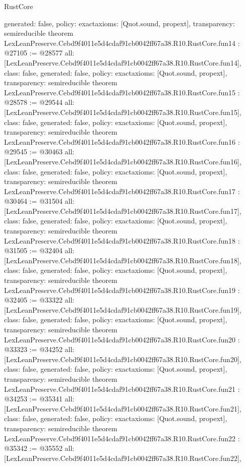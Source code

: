 \begin{lexlean}{RustCore}
\begin{coremodule}
{  generated: false,
  policy: exact{axioms: [Quot.sound, propext]},
  transparency: semireducible
}
theorem LexLeanPreserve.Cebd9f4011e5d4cdaf91cb0042ff67a38.R10.RustCore.fun14 : @27105 := @28577 {
  all: [LexLeanPreserve.Cebd9f4011e5d4cdaf91cb0042ff67a38.R10.RustCore.fun14],
  class: false,
  generated: false,
  policy: exact{axioms: [Quot.sound, propext]},
  transparency: semireducible
}
theorem LexLeanPreserve.Cebd9f4011e5d4cdaf91cb0042ff67a38.R10.RustCore.fun15 : @28578 := @29544 {
  all: [LexLeanPreserve.Cebd9f4011e5d4cdaf91cb0042ff67a38.R10.RustCore.fun15],
  class: false,
  generated: false,
  policy: exact{axioms: [Quot.sound, propext]},
  transparency: semireducible
}
theorem LexLeanPreserve.Cebd9f4011e5d4cdaf91cb0042ff67a38.R10.RustCore.fun16 : @29545 := @30463 {
  all: [LexLeanPreserve.Cebd9f4011e5d4cdaf91cb0042ff67a38.R10.RustCore.fun16],
  class: false,
  generated: false,
  policy: exact{axioms: [Quot.sound, propext]},
  transparency: semireducible
}
theorem LexLeanPreserve.Cebd9f4011e5d4cdaf91cb0042ff67a38.R10.RustCore.fun17 : @30464 := @31504 {
  all: [LexLeanPreserve.Cebd9f4011e5d4cdaf91cb0042ff67a38.R10.RustCore.fun17],
  class: false,
  generated: false,
  policy: exact{axioms: [Quot.sound, propext]},
  transparency: semireducible
}
theorem LexLeanPreserve.Cebd9f4011e5d4cdaf91cb0042ff67a38.R10.RustCore.fun18 : @31505 := @32404 {
  all: [LexLeanPreserve.Cebd9f4011e5d4cdaf91cb0042ff67a38.R10.RustCore.fun18],
  class: false,
  generated: false,
  policy: exact{axioms: [Quot.sound, propext]},
  transparency: semireducible
}
theorem LexLeanPreserve.Cebd9f4011e5d4cdaf91cb0042ff67a38.R10.RustCore.fun19 : @32405 := @33322 {
  all: [LexLeanPreserve.Cebd9f4011e5d4cdaf91cb0042ff67a38.R10.RustCore.fun19],
  class: false,
  generated: false,
  policy: exact{axioms: [Quot.sound, propext]},
  transparency: semireducible
}
theorem LexLeanPreserve.Cebd9f4011e5d4cdaf91cb0042ff67a38.R10.RustCore.fun20 : @33323 := @34252 {
  all: [LexLeanPreserve.Cebd9f4011e5d4cdaf91cb0042ff67a38.R10.RustCore.fun20],
  class: false,
  generated: false,
  policy: exact{axioms: [Quot.sound, propext]},
  transparency: semireducible
}
theorem LexLeanPreserve.Cebd9f4011e5d4cdaf91cb0042ff67a38.R10.RustCore.fun21 : @34253 := @35341 {
  all: [LexLeanPreserve.Cebd9f4011e5d4cdaf91cb0042ff67a38.R10.RustCore.fun21],
  class: false,
  generated: false,
  policy: exact{axioms: [Quot.sound, propext]},
  transparency: semireducible
}
theorem LexLeanPreserve.Cebd9f4011e5d4cdaf91cb0042ff67a38.R10.RustCore.fun22 : @35342 := @35552 {
  all: [LexLeanPreserve.Cebd9f4011e5d4cdaf91cb0042ff67a38.R10.RustCore.fun22],
}
\end{coremodule}
\end{lexlean}
